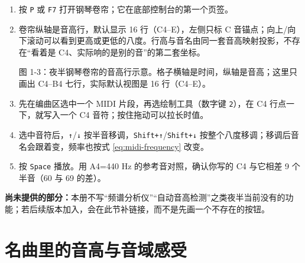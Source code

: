 \begin{enumerate}
  \item 按 \texttt{P} 或 \texttt{F7} 打开钢琴卷帘；它在底部控制台的第一个页签。
  \item 卷帘纵轴是音高行，默认显示 16 行（C4–E），左侧只标 C 音锚点；向上/向下滚动可以看到更高或更低的八度。行高与音名由同一套音高映射投影，不存在“看着是 C4、实际响的是别的音”的第二套坐标。
  \begin{center}

\small 图 1-3：夜半钢琴卷帘的音高行示意。格子横轴是时间，纵轴是音高；这里只画出 C4–B4 七行，实际默认视图是 16 行（C4–E）。
\end{center}
\item 先在编曲区选中一个 MIDI 片段，再选绘制工具（数字键 \texttt{2}），在 C4 行点一下，就写入一个 C4 音符；按住拖动可以拉长时值。
  \item 选中音符后，\texttt{↑}/\texttt{↓} 按半音移调，\texttt{Shift+↑}/\texttt{Shift+↓} 按整个八度移调；移调后音名会跟着变，频率也按式 \eqref{eq:midi-frequency} 改变。
  \item 按 \texttt{Space} 播放。用 A4=440 Hz 的参考音对照，确认你写的 C4 与它相差 9 个半音（60 与 69 的差）。
\end{enumerate}




\textbf{尚未提供的部分：}本册不写“频谱分析仪”“自动音高检测”之类夜半当前没有的功能；若后续版本加入，会在此节补链接，而不是先画一个不存在的按钮。

\section{名曲里的音高与音域感受}

